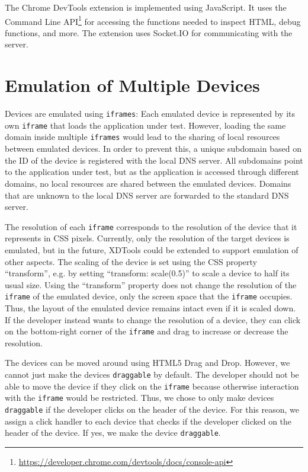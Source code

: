 The Chrome DevTools extension is implemented using JavaScript. It uses the Command Line API\footnote{\url{https://developer.chrome.com/devtools/docs/console-api}} for accessing the functions needed to inspect HTML, debug functions, and more. The extension uses Socket.IO for communicating with the server. 

\section{Emulation of Multiple Devices}

Devices are emulated using \lstinline|iframes|: Each emulated device is represented by its own \lstinline|iframe| that loads the application under test. However, loading the same domain inside multiple \lstinline|iframes| would lead to the sharing of local resources between emulated devices.  In order to prevent this, a unique subdomain based on the ID of the device is registered with the local DNS server. All subdomains point to the application under test, but as the application is accessed through different domains, no local resources are shared between the emulated devices. Domains that are unknown to the local DNS server are forwarded to the standard DNS server. 

The resolution of each \lstinline|iframe| corresponds to the resolution of the device that it represents in CSS pixels. Currently, only the resolution of the target devices is emulated, but in the future, XDTools could be extended to support emulation of other aspects. The scaling of the device is set using the CSS property ``transform'', e.g. by setting ``transform: scale(0.5)'' to scale a device to half its usual size. Using the ``transform'' property does not change the resolution of the \lstinline|iframe| of the emulated device, only the screen space that the \lstinline|iframe| occupies. Thus, the layout of the emulated device remains intact even if it is scaled down. If the developer instead wants to change the resolution of a device, they can click on the bottom-right corner of the \lstinline|iframe| and drag to increase or decrease the resolution. 

The devices can be moved around using HTML5 Drag and Drop. However, we cannot just make the devices \lstinline|draggable| by default. The developer should not be able to move the device if they click on the \lstinline|iframe| because otherwise interaction with the \lstinline|iframe| would be restricted. Thus, we chose to only make devices \lstinline|draggable| if the developer clicks on the header of the device. For this reason, we assign a click handler to each device that checks if the developer clicked on the header of the device. If yes, we make the device \lstinline|draggable|. 

